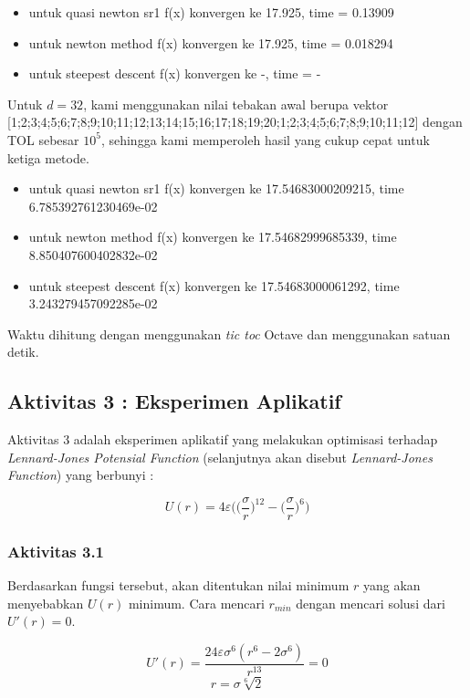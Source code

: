 \documentclass[11pt]{article}
\begin{document}
\begin{itemize}
    \item untuk quasi newton sr1 f(x) konvergen ke 17.925, time = 0.13909
    \item untuk newton method f(x) konvergen ke  17.925, time = 0.018294
    \item untuk steepest descent f(x) konvergen ke -, time = -
\end{itemize}

\medskip
Untuk $d = 32$, kami menggunakan nilai tebakan awal berupa vektor
[1;2;3;4;5;6;7;8;9;10;11;12;13;14;15;16;17;18;19;20;1;2;3;4;5;6;7;8;9;10;11;12]
dengan TOL sebesar $10^{5}$, sehingga kami memperoleh hasil yang cukup cepat untuk ketiga metode.
\begin{itemize}
    \item untuk quasi newton sr1 f(x) konvergen ke 17.54683000209215, time 6.785392761230469e-02
    \item untuk newton method f(x) konvergen ke  17.54682999685339, time 8.850407600402832e-02
    \item untuk steepest descent f(x) konvergen ke 17.54683000061292, time 3.243279457092285e-02
\end{itemize}

Waktu dihitung dengan menggunakan \textit{tic toc} Octave dan menggunakan satuan detik.

\medskip

\subsection{Aktivitas 3 : Eksperimen Aplikatif}

\medskip
Aktivitas 3 adalah eksperimen aplikatif yang melakukan optimisasi terhadap \textit{Lennard-Jones Potensial Function} (selanjutnya akan disebut \textit{Lennard-Jones Function}) yang berbunyi :

\[
    U(r) = 4\varepsilon\bigg(\Big(\frac{\sigma}{r}\Big)^{12} - \Big(\frac{\sigma}{r}\Big)^6\bigg)
\]

\subsubsection{Aktivitas 3.1}
Berdasarkan fungsi tersebut, akan ditentukan nilai minimum $r$ yang akan menyebabkan $U(r)$ minimum. Cara mencari $r_{min}$ dengan mencari solusi dari $U'(r) = 0$.

\[
    U'(r) = \frac{24\varepsilon\sigma^6(r^6-2\sigma^6)}{r^{13}} = 0
\]
\[
    r = \sigma\sqrt[6]{2}
\]
\end{document}
